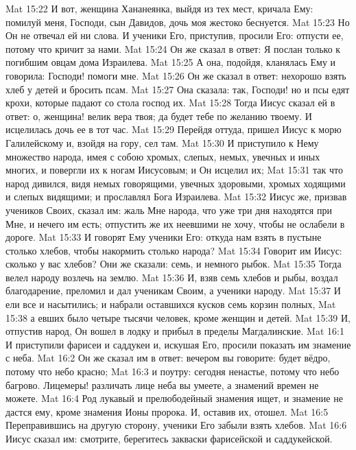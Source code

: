 \vs Mat 15:22 И вот, женщина Хананеянка, выйдя из тех мест, кричала Ему: помилуй меня, Господи, сын Давидов, дочь моя жестоко беснуется.
\vs Mat 15:23 Но Он не отвечал ей ни слова. И ученики Его, приступив, просили Его: отпусти ее, потому что кричит за нами.
\vs Mat 15:24 Он же сказал в ответ: Я послан только к погибшим овцам дома Израилева.
\vs Mat 15:25 А она, подойдя, кланялась Ему и говорила: Господи! помоги мне.
\vs Mat 15:26 Он же сказал в ответ: нехорошо взять хлеб у детей и бросить псам.
\vs Mat 15:27 Она сказала: так, Господи! но и псы едят крохи, которые падают со стола господ их.
\vs Mat 15:28 Тогда Иисус сказал ей в ответ: о, женщина! велик вера твоя; да будет тебе по желанию твоему. И исцелилась дочь ее в тот час.
\rsbpar\vs Mat 15:29 Перейдя оттуда, пришел Иисус к морю Галилейскому и, взойдя на гору, сел там.
\vs Mat 15:30 И приступило к Нему множество народа, имея с собою хромых, слепых, немых, увечных и иных многих, и повергли их к ногам Иисусовым; и Он исцелил их;
\vs Mat 15:31 так что народ дивился, видя немых говорящими, увечных здоровыми, хромых ходящими и слепых видящими; и прославлял Бога Израилева.
\rsbpar\vs Mat 15:32 Иисус же, призвав учеников Своих, сказал им: жаль Мне народа, что уже три дня находятся при Мне, и нечего им есть; отпустить же их неевшими не хочу, чтобы не ослабели в дороге.
\vs Mat 15:33 И говорят Ему ученики Его: откуда нам взять в пустыне столько хлебов, чтобы накормить столько народа?
\vs Mat 15:34 Говорит им Иисус: сколько у вас хлебов? Они же сказали: семь, и немного рыбок.
\vs Mat 15:35 Тогда велел народу возлечь на землю.
\vs Mat 15:36 И, взяв семь хлебов и рыбы, воздал благодарение, преломил и дал ученикам Своим, а ученики народу.
\vs Mat 15:37 И ели все и насытились; и набрали оставшихся кусков семь корзин полных,
\vs Mat 15:38 а евших было четыре тысячи человек, кроме женщин и детей.
\rsbpar\vs Mat 15:39 И, отпустив народ, Он вошел в лодку и прибыл в пределы Магдалинские.
\vs Mat 16:1 И приступили фарисеи и саддукеи и, искушая Его, просили показать им знамение с неба.
\vs Mat 16:2 Он же сказал им в ответ: вечером вы говорите: будет вёдро, потому что небо красно;
\vs Mat 16:3 и поутру: сегодня ненастье, потому что небо багрово. Лицемеры! различать лице неба вы умеете, а знамений времен не можете.
\vs Mat 16:4 Род лукавый и прелюбодейный знамения ищет, и знамение не дастся ему, кроме знамения Ионы пророка. И, оставив их, отошел.
\rsbpar\vs Mat 16:5 Переправившись на другую сторону, ученики Его забыли взять хлебов.
\vs Mat 16:6 Иисус сказал им: смотрите, берегитесь закваски фарисейской и саддукейской.
